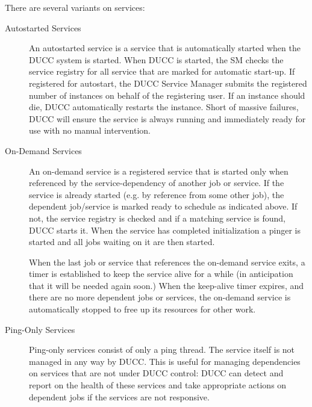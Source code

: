       There are several variants on services:
      \begin{description}

        \item[Autostarted Services] An autostarted service is a  service that is
          automatically started when the DUCC system is started. When DUCC is started, the SM checks the
          service registry for all service that are marked for automatic start-up.  If registered for autostart,
          the DUCC Service Manager submits the registered number of instances
          on behalf of the registering user.  If an instance should die, DUCC automatically restarts
          the instance.  Short of massive failures, DUCC will ensure the service is always running
          and immediately ready for use with no manual intervention.
          
        \item[On-Demand Services] An on-demand service is a registered service that is started only
          when referenced by the service-dependency of another job or service. If the service is
          already started (e.g. by reference from some other job), the dependent job/service is
          marked ready to schedule as indicated above. If not, the service registry is checked and
          if a matching service is found, DUCC starts it. When the service has completed
          initialization a pinger is started and all jobs waiting on it are then started.
          
          When the last job or service that references the on-demand service exits, a timer is
          established to keep the service alive for a while (in anticipation that it will be needed
          again soon.)  When the keep-alive timer expires, and there are no more dependent
          jobs or services, the on-demand service is automatically stopped to free up its resources for
          other work.

        \item[Ping-Only Services] 
          \label{subsub:services.ping-only}
          Ping-only services consist of only
          a ping thread.  The service itself is not managed in any way by DUCC.  This is useful for
          managing dependencies on services that are not under DUCC control: DUCC can detect and
          report on the health of these services and take appropriate actions on dependent jobs if
          the services are not responsive.
      \end{description}
          
